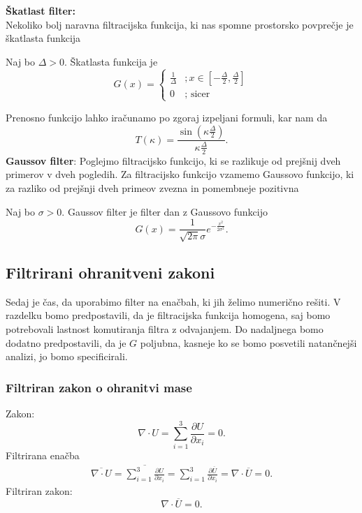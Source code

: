 \documentclass[mat2, tisk]{fmfdelo}
\begin{document}
\noindent
\textbf{Škatlast filter:}\\
Nekoliko bolj naravna filtracijska funkcija, ki nas spomne prostorsko povprečje je 
škatlasta funkcija 
\begin{definicija}
Naj bo $\Delta > 0$. Škatlasta funkcija je 
\begin{equation}
G(x)= \begin{cases}\frac{1}{\Delta} & ; x \in\left[-\frac{\Delta}{2}, \frac{\Delta}{2}\right] \\ 0 & ; \text { sicer }\end{cases}
\end{equation}
\end{definicija}

Prenosno funkcijo lahko iračunamo po zgoraj izpeljani formuli, kar nam da 
$$
T(\kappa) = \frac{\sin(\kappa \frac{\Delta}{2})}{\kappa \frac{\Delta}{2}}.
$$
\noindent
\textbf{Gaussov filter}:
Poglejmo filtracijsko funkcijo, ki se razlikuje od prejšnij dveh primerov v dveh pogledih.
Za filtracijsko funkcijo vzamemo Gaussovo funkcijo, ki za razliko od prejšnji dveh 
primeov zvezna in pomembneje pozitivna
\begin{definicija}
Naj bo $\sigma > 0$. Gaussov filter je filter dan z Gaussovo funkcijo 
\begin{equation}
G(x) = \frac{1}{\sqrt{2\pi}\sigma} e^{-\frac{x^2}{2\sigma^2}}.
\end{equation}
\end{definicija}

\newpage

\subsection{Filtrirani ohranitveni zakoni}

Sedaj je čas, da uporabimo filter na enačbah, ki jih želimo numerično rešiti. V 
razdelku bomo predpostavili, da je filtracijska funkcija homogena, saj bomo potrebovali 
lastnost komutiranja filtra z odvajanjem. Do nadaljnega bomo dodatno predpostavili, 
da je $G$ poljubna, kasneje ko se bomo posvetili natančnejši analizi, jo bomo specificirali.

\subsubsection{Filtriran zakon o ohranitvi mase}

Zakon:
$$
\nabla\cdot U = \sum_{i=1}^3 \frac{\partial U}{\partial x_i} = 0.
$$
\noindent
Filtrirana enačba 
\begin{align*}
\overline{\nabla\cdot U}= \overline{\sum_{i=1}^3 \frac{\partial U}{\partial x_i}} = 
\sum_{i=1}^3 \frac{\partial \overline{U}}{\partial x_i} = \nabla\cdot \overline{U} = 0.
\end{align*}
\noindent
Filtriran zakon:
\begin{equation}
\nabla\cdot\overline{U} = 0.
\end{equation}
\end{document}
